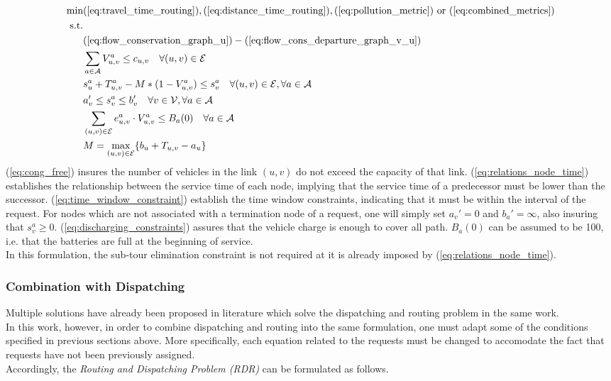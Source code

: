 \begin{align}
	\text{min}&  
		(\ref{eq:travel_time_routing}), (\ref{eq:distance_time_routing}), (\ref{eq:pollution_metric}) \text{ or } (\ref{eq:combined_metrics})
	\nonumber\\
	\text{s.t.} &\nonumber\\
	&(\ref{eq:flow_conservation_graph_u})-(\ref{eq:flow_cons_departure_graph_v_u})\nonumber\\
	&\sum_{a \in \mathcal{A}}V^a_{u,v} \leq c_{u,v} \quad \forall (u,v) \in \mathcal{E} \label{eq:cong_free}\\
	&s_{u}^a + T_{u,v}^a - M*(1-V^a_{u,v}) \leq s_{v}^a  \quad \forall (u,v) \in \mathcal{E}, \forall a \in \mathcal{A}\label{eq:relations_node_time}\\
	&a'_v \leq s_{v}^a \leq b'_v \quad \forall v \in \mathcal{V}, \forall a \in \mathcal{A}\label{eq:time_window_constraint}\\
	&\sum_{(u,v) \in \mathcal{E}}e^a_{u,v}\cdot V^a_{u,v} \leq B_a(0)\quad \forall a \in \mathcal{A} \label{eq:discharging_constraints}\\
	&M= \underset{(u,v) \in \mathcal{E}}{\text{max}}\{b_u + T_{u,v}-a_u\}\nonumber
\end{align} 
(\ref{eq:cong_free}) insures the number of vehicles in the link $(u,v)$ do not exceed the capacity of that link. (\ref{eq:relations_node_time}) establishes the relationship between the service time of each node, implying that the service time of a predecessor must be lower than the successor. (\ref{eq:time_window_constraint}) establish the time window constraints, indicating that it must be within the interval of the request. For nodes which are not associated with a termination node of a  request, one will simply set $a_v' = 0 $ and $b_a' = \infty$, also insuring that $s_v^a \ge 0 $. (\ref{eq:discharging_constraints}) assures that the vehicle charge is enough to cover all path. $B_a(0)$ can be assumed to be 100, i.e. that the batteries are full at the beginning of service. \\
In this formulation, the sub-tour elimination constraint is not required at it is already imposed by (\ref{eq:relations_node_time}). \\
\subsubsection*{Combination with Dispatching}
Multiple solutions have already been proposed in literature which solve the dispatching and routing problem in the same work. \\
In this work, however, in order to combine dispatching and routing into the same formulation, one must adapt some of the conditions specified in previous sections above. More specifically, each equation related to the requests must be changed to accomodate the fact that requests have not been previously assigned. \\
Accordingly, the \textit{Routing and Dispatching Problem (RDR)} can be formulated as follows. 

